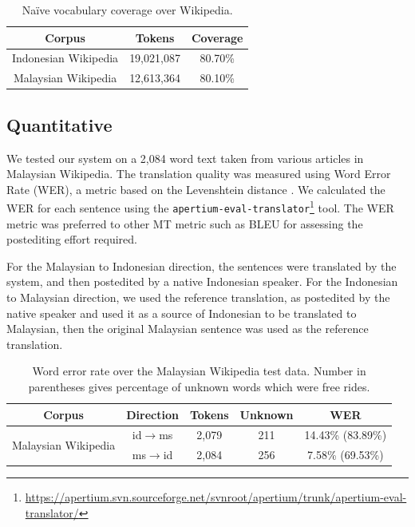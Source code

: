 \documentclass[10pt,a5paper,twoside]{article}
\begin{document}
\begin{table}[htbp]
  \begin{center}
  \begin{tabular}{ccc}
  \toprule
  \bf{Corpus} & \bf{Tokens} & \bf{Coverage}\\
  \midrule
  Indonesian Wikipedia & 19,021,087 & 80.70\% \\
  \midrule
  Malaysian Wikipedia & 12,613,364 & 80.10\% \\
  \bottomrule
  \end{tabular}
  \caption{Na\"ive vocabulary coverage over Wikipedia.}
  \label{table:coverage}
  \end{center}
\end{table}

\subsection{Quantitative}
We tested our system on a 2,084 word text taken from various articles in Malaysian Wikipedia. The translation quality was measured using Word Error Rate (WER), a metric based on the Levenshtein distance \citep{levenshtein/1966}. We calculated the WER for each sentence using the \texttt{\small{apertium-eval-translator}}\footnote{\url{https://apertium.svn.sourceforge.net/svnroot/apertium/trunk/apertium-eval-translator/}} tool. The WER metric was preferred to other MT metric such as BLEU \citep{Papineni2002bleu} for assessing the postediting effort required.

For the Malaysian to Indonesian direction, the sentences were translated by the system, and then postedited by a native Indonesian speaker. For the Indonesian to Malaysian direction, we used the reference translation, as postedited by the native speaker and used it as a source of Indonesian to be translated to Malaysian, then the original Malaysian sentence was used as the reference translation.

\begin{table}[htbp]
  \begin{center}
  \begin{tabular}{ccccc}
  \toprule
  \bf{Corpus}                 & \bf{Direction}         & \bf{Tokens}  & \bf{Unknown} & \bf{WER}  \\
  \midrule
  \multirow{2}{*}{Malaysian Wikipedia} & id$\rightarrow$ms & 2,079     & 211  & 14.43\% (83.89\%) \\
                          & ms$\rightarrow$id & 2,084     & 256  & 7.58\% (69.53\%)  \\
  \bottomrule
  \end{tabular}
    \caption{Word error rate over the Malaysian Wikipedia test data. Number in parentheses gives percentage of unknown words which were free rides.}
    \label{table:wer}
  \end{center}
\end{table}
\end{document}
